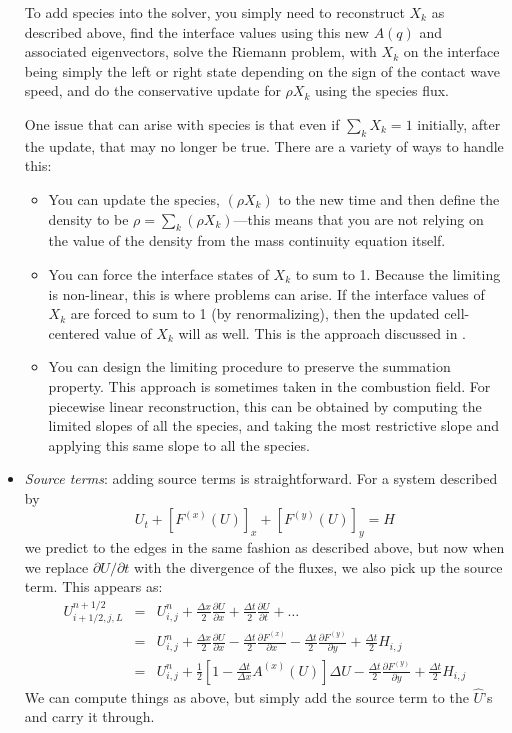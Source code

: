 \begin{itemize}
To add species into the solver, you simply need to reconstruct $X_k$
as described above, find the interface values using this new $A(q)$
and associated eigenvectors, solve the Riemann problem, with $X_k$ on
the interface being simply the left or right state depending on the
sign of the contact wave speed, and do the conservative update for
$\rho X_k$ using the species flux.

One issue that can arise with species is that even if $\sum_k X_k = 1$
initially, after the update, that may no longer be true.  There are a 
variety of ways to handle this:
\begin{itemize}
\item You can update the species, $(\rho X_k)$ to the new time and then
define the density to be $\rho = \sum_k (\rho X_k)$---this means that
you are not relying on the value of the density from the mass continuity
equation itself.  

\item You can force the interface states of $X_k$ to sum to 1.  Because
the limiting is non-linear, this is where problems can arise.  If the 
interface values of $X_k$ are forced to sum to 1 (by renormalizing), then
the updated cell-centered value of $X_k$ will as well.  This is the
approach discussed in \cite{plewamuller:1999}.

\item You can design the limiting procedure to preserve the summation
property.  This approach is sometimes taken in the combustion field. 
For piecewise linear reconstruction, this can be obtained by computing
the limited slopes of all the species, and taking the most restrictive
slope and applying this same slope to all the species.
\end{itemize}

\item {\em Source terms}: adding source terms is straightforward.  For
a system described by
\begin{equation}
U_t + [F^{(x)}(U)]_x + [F^{(y)}(U)]_y = H
\end{equation}
we predict to the edges in the same fashion as described above, but now
when we replace $\partial U/\partial t$ with the divergence of the
fluxes, we also pick up the source term.  This appears as:
\begin{eqnarray}
U_{i+1/2,j,L}^{n+1/2} &=& U_{i,j}^n 
            + \frac{\Delta x}{2} \frac{\partial U}{\partial x} 
            + \frac{\Delta t}{2} \frac{\partial U}{\partial t} + \ldots \\
&=& U_{i,j}^n + \frac{\Delta x}{2} \frac{\partial U}{\partial x} 
              - \frac{\Delta t}{2} \frac{\partial F^{(x)}}{\partial x} 
              - \frac{\Delta t}{2} \frac{\partial F^{(y)}}{\partial y} 
              + \frac{\Delta t}{2} H_{i,j} \\
&=& U_{i,j}^n 
 + \frac{1}{2} \left [1 -\frac{\Delta t}{\Delta x} A^{(x)}(U)\right ] \Delta U 
 - \frac{\Delta t}{2} \frac{\partial F^{(y)}}{\partial y}
 + \frac{\Delta t}{2} H_{i,j}
  \label{eq:Utaylorstatesource}
\end{eqnarray}
We can compute things as above, but simply add the source term to the
$\hat{U}$'s and carry it through.  


\end{itemize}
